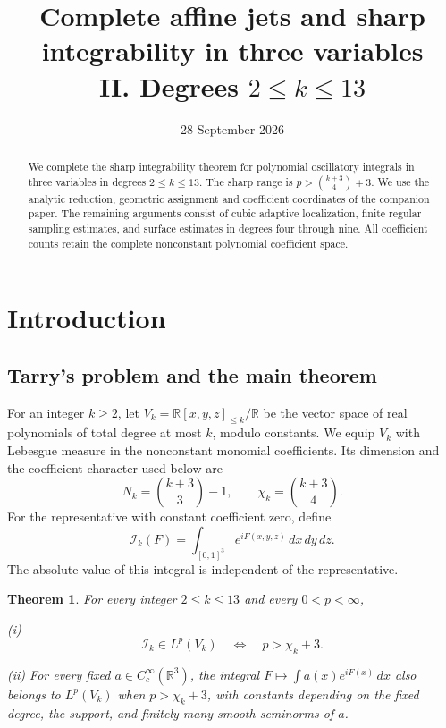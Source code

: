 \documentclass[11pt]{amsart}
\title[Complete affine jets II]{Complete affine jets and sharp integrability in three variables\\II. Degrees $2\le k\le13$}
\author{}
\date{28 September 2026}
\newtheorem{theorem}{Theorem}[section]
\theoremstyle{definition}
\theoremstyle{remark}
\newcommand{\R}{\mathbb R}
\numberwithin{equation}{section}
\begin{document}
\begin{abstract}
We complete the sharp integrability theorem for polynomial oscillatory integrals in three variables in degrees $2\le k\le13$. The sharp range is $p>\binom{k+3}{4}+3$. We use the analytic reduction, geometric assignment and coefficient coordinates of the companion paper. The remaining arguments consist of cubic adaptive localization, finite regular sampling estimates, and surface estimates in degrees four through nine. All coefficient counts retain the complete nonconstant polynomial coefficient space.
\end{abstract}
\maketitle\enlargethispage{3pt}
\tableofcontents


\section{Introduction}\label{root:introduction}

\subsection{Tarry's problem and the main theorem}\label{intro:main}

For an integer $k\ge2$, let $V_k=\R[x,y,z]_{\le k}/\R$ be the vector space of real polynomials of total degree at most $k$, modulo constants. We equip $V_k$ with Lebesgue measure in the nonconstant monomial coefficients. Its dimension and the coefficient character used below are
\[
N_k=\binom{k+3}{3}-1,\qquad \chi_k=\binom{k+3}{4}.
\]
For the representative with constant coefficient zero, define
\[
 \mathcal I_k(F)=\int_{[0,1]^3}e^{iF(x,y,z)}\,dx\,dy\,dz.
\]
The absolute value of this integral is independent of the representative.

\begin{theorem}\label{root:main}\label{low:4:pf:assembly}\label{low:5:qpf:assembly}\label{low:5:qga:actual-upper}
For every integer $2\le k\le13$ and every $0<p<\infty$,

\noindent\textup{(i)} \[ \mathcal I_k\in L^p(V_k)\quad\Longleftrightarrow\quad p>\chi_k+3. \]

\noindent\textup{(ii)} For every fixed $a\in C_c^\infty(\R^3)$, the integral $F\mapsto\int a(x)e^{iF(x)}\,dx$ also belongs to $L^p(V_k)$ when $p>\chi_k+3$, with constants depending on the fixed degree, the support, and finitely many smooth seminorms of $a$.
\end{theorem}
\end{document}
